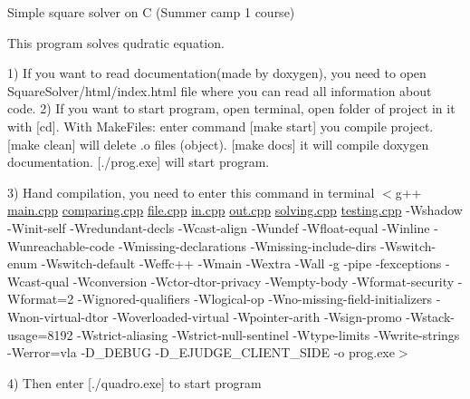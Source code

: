 Simple square solver on C (Summer camp 1 course)

This program solves qudratic equation.

1) If you want to read documentation(made by doxygen), you need to open Square\+Solver/html/index.\+html file where you can read all information about code. 2) If you want to start program, open terminal, open folder of project in it with \mbox{[}cd\mbox{]}. With Make\+Files\+: enter command \mbox{[}make start\mbox{]} you compile project. \mbox{[}make clean\mbox{]} will delete .o files (object). \mbox{[}make docs\mbox{]} it will compile doxygen documentation. \mbox{[}./prog.exe\mbox{]} will start program.

3) Hand compilation, you need to enter this command in terminal $<$g++ \mbox{\hyperlink{main_8cpp}{main.\+cpp}} \mbox{\hyperlink{comparing_8cpp}{comparing.\+cpp}} \mbox{\hyperlink{file_8cpp}{file.\+cpp}} \mbox{\hyperlink{in_8cpp}{in.\+cpp}} \mbox{\hyperlink{out_8cpp}{out.\+cpp}} \mbox{\hyperlink{solving_8cpp}{solving.\+cpp}} \mbox{\hyperlink{testing_8cpp}{testing.\+cpp}} -\/Wshadow -\/Winit-\/self -\/Wredundant-\/decls -\/Wcast-\/align -\/Wundef -\/Wfloat-\/equal -\/Winline -\/Wunreachable-\/code -\/Wmissing-\/declarations -\/Wmissing-\/include-\/dirs -\/Wswitch-\/enum -\/Wswitch-\/default -\/Weffc++ -\/Wmain -\/Wextra -\/Wall -\/g -\/pipe -\/fexceptions -\/Wcast-\/qual -\/Wconversion -\/Wctor-\/dtor-\/privacy -\/Wempty-\/body -\/Wformat-\/security -\/Wformat=2 -\/Wignored-\/qualifiers -\/Wlogical-\/op -\/Wno-\/missing-\/field-\/initializers -\/Wnon-\/virtual-\/dtor -\/Woverloaded-\/virtual -\/Wpointer-\/arith -\/Wsign-\/promo -\/Wstack-\/usage=8192 -\/Wstrict-\/aliasing -\/Wstrict-\/null-\/sentinel -\/Wtype-\/limits -\/Wwrite-\/strings -\/Werror=vla -\/D\+\_\+\+DEBUG -\/D\+\_\+\+EJUDGE\+\_\+\+CLIENT\+\_\+\+SIDE -\/o prog.\+exe$>$

4) Then enter \mbox{[}./quadro.exe\mbox{]} to start program 